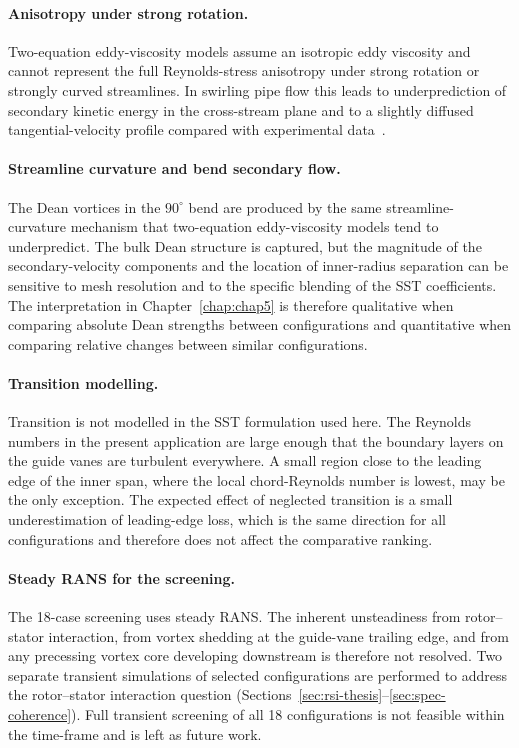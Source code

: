 \paragraph{Anisotropy under strong rotation.} Two-equation eddy-viscosity models assume an isotropic eddy viscosity and cannot represent the full Reynolds-stress anisotropy under strong rotation or strongly curved streamlines. In swirling pipe flow this leads to underprediction of secondary kinetic energy in the cross-stream plane and to a slightly diffused tangential-velocity profile compared with experimental data~\cite{EscueCui2010}.
 
\paragraph{Streamline curvature and bend secondary flow.} The Dean vortices in the $90^\circ$ bend are produced by the same streamline-curvature mechanism that two-equation eddy-viscosity models tend to underpredict. The bulk Dean structure is captured, but the magnitude of the secondary-velocity components and the location of inner-radius separation can be sensitive to mesh resolution and to the specific blending of the SST coefficients. The interpretation in Chapter~\ref{chap:chap5} is therefore qualitative when comparing absolute Dean strengths between configurations and quantitative when comparing relative changes between similar configurations.
 
\paragraph{Transition modelling.} Transition is not modelled in the SST formulation used here. The Reynolds numbers in the present application are large enough that the boundary layers on the guide vanes are turbulent everywhere. A small region close to the leading edge of the inner span, where the local chord-Reynolds number is lowest, may be the only exception. The expected effect of neglected transition is a small underestimation of leading-edge loss, which is the same direction for all configurations and therefore does not affect the comparative ranking.
 
\paragraph{Steady RANS for the screening.} The 18-case screening uses steady RANS. The inherent unsteadiness from rotor--stator interaction, from vortex shedding at the guide-vane trailing edge, and from any precessing vortex core developing downstream is therefore not resolved. Two separate transient simulations of selected configurations are performed to address the rotor--stator interaction question (Sections~\ref{sec:rsi-thesis}--\ref{sec:spec-coherence}). Full transient screening of all 18 configurations is not feasible within the time-frame and is left as future work.

